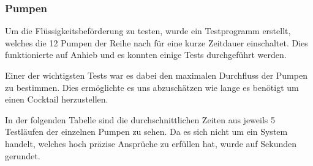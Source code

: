 \subsubsection{Pumpen}
\label{subsubsec:Inbetriebnahme_Pumpen}

Um die Flüssigkeitsbeförderung zu testen, wurde ein Testprogramm erstellt, welches die 12 Pumpen der Reihe nach für eine kurze Zeitdauer einschaltet. Dies funktionierte auf Anhieb und es konnten einige Tests durchgeführt werden. 

Einer der wichtigsten Tests war es dabei den maximalen Durchfluss der Pumpen zu bestimmen. Dies ermöglichte es uns abzuschätzen wie lange es benötigt um einen Cocktail herzustellen. 

In der folgenden Tabelle sind die durchschnittlichen Zeiten aus jeweils 5 Testläufen der einzelnen Pumpen zu sehen. Da es sich nicht um ein System handelt, welches hoch präzise Ansprüche zu erfüllen hat, wurde auf Sekunden gerundet.

